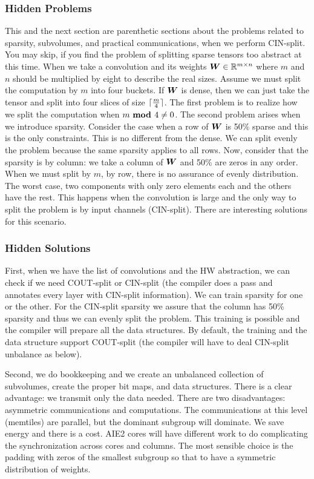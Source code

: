 \documentclass[conference]{IEEEtran}
\begin{document}
\subsubsection{Hidden Problems}
This and the next section are parenthetic sections about the problems
related to sparsity, subvolumes, and practical communications, when we
perform CIN-split. You may skip, if you find the problem of splitting
sparse tensors too abstract at this time. When we take a convolution
and its weights ${\boldsymbol W} \in \mathbb{R} ^{m\times n}$ where $m$ and $n$ should
be multiplied by eight to describe the real sizes.  Assume we must
split the computation by $m$ into four buckets. If ${\boldsymbol W}$ is dense,
then we can just take the tensor and split into four slices of size
${\lceil {\frac{m}{4}} \rceil}$. The first problem is to realize how we split the
computation when ${m}{\text{ \bf mod }}{4}\neq 0$. The second problem arises when we
introduce sparsity. Consider the case when a row of ${\boldsymbol W}$ is 50\%
sparse and this is the only constraints.  This is no different from
the dense. We can split evenly the problem because the same sparsity
applies to all rows. Now, consider that the sparsity is by column: we
take a column of ${\boldsymbol W}$ and 50\% are zeros in any order.  When we
must split by $m$, by row, there is no assurance of evenly
distribution. The worst case, two components with only zero elements
each and the others have the rest.  This happens when the convolution
is large and the only way to split the problem is by input channels
(CIN-split). There are interesting solutions for this scenario.
\subsubsection{Hidden Solutions}
First, when we have the list of convolutions and the HW abstraction,
we can check if we need COUT-split or CIN-split (the compiler does a
pass and annotates every layer with CIN-split information). We can
train sparsity for one or the other. For the CIN-split sparsity we
assure that the column has 50\% sparsity and thus we can evenly split
the problem. This training is possible and the compiler will prepare
all the data structures. By default, the training and the data
structure support COUT-split (the compiler will have to deal CIN-split
unbalance as below).

Second, we do bookkeeping and we create an unbalanced
collection of subvolumes, create the proper bit maps, and data
structures. There is a clear advantage: we transmit only the data
needed.  There are two disadvantages: asymmetric communications and
computations. The communications at this level (memtiles) are
parallel, but the dominant subgroup will dominate. We save energy and
there is a cost. AIE2 cores will have different work to do
complicating the synchronization across cores and columns.  The most
sensible choice is the padding with zeros of the smallest subgroup so
that to have a symmetric distribution of weights.
\end{document}
